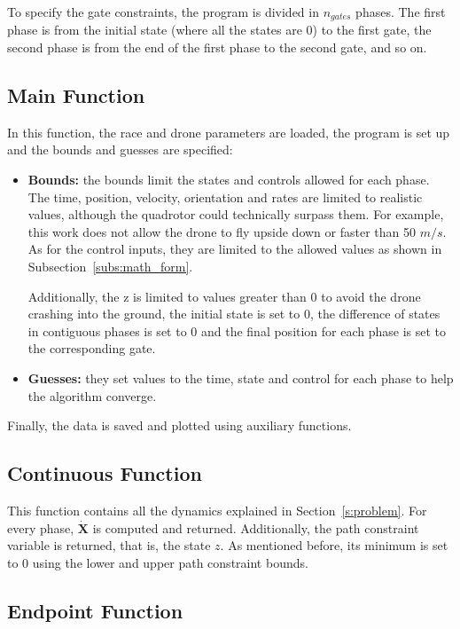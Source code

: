 \documentclass[letterpaper, 10 pt, conference]{ieeeconf}  %
\begin{document}
To specify the gate constraints, the program is divided in $n_{gates}$ phases. The first phase is from the initial state (where all the states are 0) to the first gate, the second phase is from the end of the first phase to the second gate, and so on.

\subsection{Main Function}
In this function, the race and drone parameters are loaded, the program is set up and the bounds and guesses are specified:
\begin{itemize}
	\item \textbf{Bounds:} the bounds limit the states and controls allowed for each phase. The time, position, velocity, orientation and rates are limited to realistic values, although the quadrotor could technically surpass them. For example, this work does not allow the drone to fly upside down or faster than 50 $m/s$. As for the control inputs, they are limited to the allowed values as shown in Subsection~\ref{subs:math_form}.
	
	Additionally, the z is limited to values greater than 0 to avoid the drone crashing into the ground, the initial state is set to 0, the difference of states in contiguous phases is set to 0 and the final position for each phase is set to the corresponding gate.
	\item \textbf{Guesses:} they set values to the time, state and control for each phase to help the algorithm converge.
\end{itemize}

Finally, the data is saved and plotted using auxiliary functions.

\subsection{Continuous Function}

This function contains all the dynamics explained in Section~\ref{s:problem}. For every phase, $\bm{\dot{X}}$ is computed and returned. Additionally, the path constraint variable is returned, that is, the state $z$. As mentioned before, its minimum is set to 0 using the lower and upper path constraint bounds.

\subsection{Endpoint Function}
\end{document}
